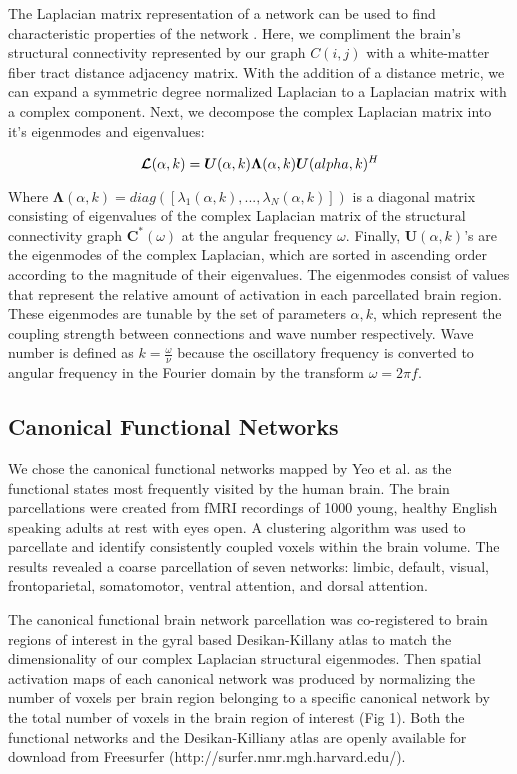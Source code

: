 \documentclass{article}
\begin{document}
The Laplacian matrix representation of a network can be used to find characteristic properties of the network \cite{Stewart1999}. Here, we compliment the brain's structural connectivity represented by our graph $C(i,j)$ with a white-matter fiber tract distance adjacency matrix. With the addition of a distance metric, we can expand a symmetric degree normalized Laplacian to a Laplacian matrix with a complex component. Next, we decompose the complex Laplacian matrix into it's eigenmodes and eigenvalues:

\begin{equation}
    \bm{\mathcal{L}}(\alpha, k) = \bm{U}(\alpha, k)\bm{\Lambda}(\alpha, k)\bm{U}(\\alpha, k)^{H}
\end{equation}

Where $\bm{\Lambda}(\alpha, k) = diag([\lambda_{1}(\alpha, k), ... , \lambda_{N}(\alpha, k)])$ is a diagonal matrix consisting of eigenvalues of the complex Laplacian matrix of the structural connectivity graph $\bm{C^*}(\omega)$ at the angular frequency $\omega$. Finally, $\bm{U}(\alpha, k)$'s are the eigenmodes of the complex Laplacian, which are sorted in ascending order according to the magnitude of their eigenvalues. The eigenmodes consist of values that represent the relative amount of activation in each parcellated brain region. These eigenmodes are tunable by the set of parameters ${\alpha, k}$, which represent the coupling strength between connections and wave number respectively. Wave number is defined as $k = \frac{\omega}{\nu}$ because the oscillatory frequency is converted to angular frequency in the Fourier domain by the transform $\omega = 2 \pi f$.

\subsection{Canonical Functional Networks}
We chose the canonical functional networks mapped by Yeo et al. \cite{Yeo2011} as the functional states most frequently visited by the human brain. The brain parcellations were created from fMRI recordings of 1000 young, healthy English speaking adults at rest with eyes open. A clustering algorithm was used to parcellate and identify consistently coupled voxels within the brain volume. The results revealed a coarse parcellation of seven networks: limbic, default, visual, frontoparietal, somatomotor, ventral attention, and dorsal attention. 

The canonical functional brain network parcellation was co-registered to brain regions of interest in the gyral based Desikan-Killany atlas \cite{Desikan2006} to match the dimensionality of our complex Laplacian structural eigenmodes. Then spatial activation maps of each canonical network was produced by normalizing the number of voxels per brain region belonging to a specific canonical network by the total number of voxels in the brain region of interest (Fig 1). Both the functional networks and the Desikan-Killiany atlas are openly available for download from Freesurfer \cite{Fischl2012} (http://surfer.nmr.mgh.harvard.edu/).
\end{document}
